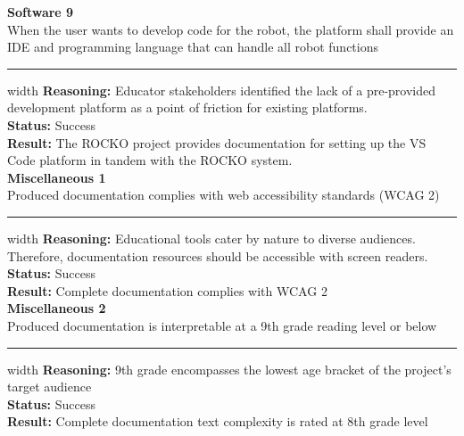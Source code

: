 \documentclass{fank1basedocument}
\begin{document}
{\large \textbf{Software 9}}\\
When the user wants to develop code for the robot, the platform shall provide an IDE and programming language that can handle all robot functions
\hrule width \linewidth
\vspace{2px}
\textbf{Reasoning:} Educator stakeholders identified the lack of a pre-provided development platform as a point of friction for existing platforms.\\
\textbf{Status:} \color{ForestGreen}Success\color{black}\\
\textbf{Result:} The ROCKO project provides documentation for setting up the VS Code platform in tandem with the ROCKO system.\\

{\large \textbf{Miscellaneous 1}}\\
Produced documentation complies with web accessibility standards (WCAG 2)
\hrule width \linewidth
\vspace{2px}
\textbf{Reasoning:} Educational tools cater by nature to diverse audiences. Therefore, documentation resources should be accessible with screen readers.\\
\textbf{Status:} \color{ForestGreen}Success\color{black}\\
\textbf{Result:} Complete documentation complies with WCAG 2\\

{\large \textbf{Miscellaneous 2}}\\
Produced documentation is interpretable at a 9th grade reading level or below
\hrule width \linewidth
\vspace{2px}
\textbf{Reasoning:} 9th grade encompasses the lowest age bracket of the project’s target audience\\
\textbf{Status:} \color{ForestGreen}Success\color{black}\\
\textbf{Result:} Complete documentation text complexity is rated at 8th grade level\\
\end{document}
